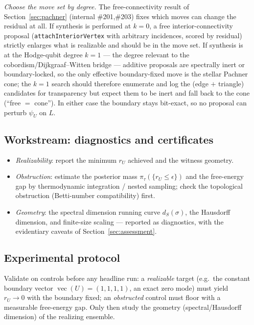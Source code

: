 \documentclass[11pt]{article}
\DeclareMathOperator{\vecop}{vec}
\theoremstyle{definition}
\theoremstyle{plain}
\begin{document}
\emph{Choose the move set by degree.} The free-connectivity result of
Section~\ref{sec:pachner} (internal \#201,\#203) fixes which moves can change the residual at
all. If synthesis is performed at $k=0$, a free interior-connectivity proposal
(\texttt{attachInteriorVertex} with arbitrary incidences, scored by residual) strictly
enlarges what is realizable and should be in the move set. If synthesis is at the
Hodge-qubit degree $k=1$ --- the degree relevant to the cobordism/Dijkgraaf--Witten bridge
--- additive proposals are spectrally inert or boundary-locked, so the only effective
boundary-fixed move is the stellar Pachner cone; the $k=1$ search should therefore enumerate
and log the (edge $+$ triangle) candidates for transparency but expect them to be inert and
fall back to the cone (``free $=$ cone''). In either case the boundary stays bit-exact, so
no proposal can perturb $\psi_U$ on $L$.

\subsection{Workstream: diagnostics and certificates}

\begin{itemize}[leftmargin=2.4em]
\item \emph{Realizability}: report the minimum $r_U$ achieved and the witness geometry.
\item \emph{Obstruction}: estimate the posterior mass $\pi_\tau(\{r_U\le\epsilon\})$ and the
free-energy gap by thermodynamic integration / nested sampling; check the topological
obstruction (Betti-number compatibility) first.
\item \emph{Geometry}: the spectral dimension running curve $d_S(\sigma)$, the Hausdorff
dimension, and finite-size scaling --- reported as diagnostics, with the evidentiary
caveats of Section~\ref{sec:assessment}.
\end{itemize}

\subsection{Experimental protocol}

Validate on controls before any headline run: a \emph{realizable} target (e.g.\ the constant
boundary vector $\vecop(U)=(1,1,1,1)$, an exact zero mode) must yield $r_U\to0$ with the
boundary fixed; an \emph{obstructed} control must floor with a measurable free-energy gap.
Only then study the geometry (spectral/Hausdorff dimension) of the realizing ensemble.
\end{document}
